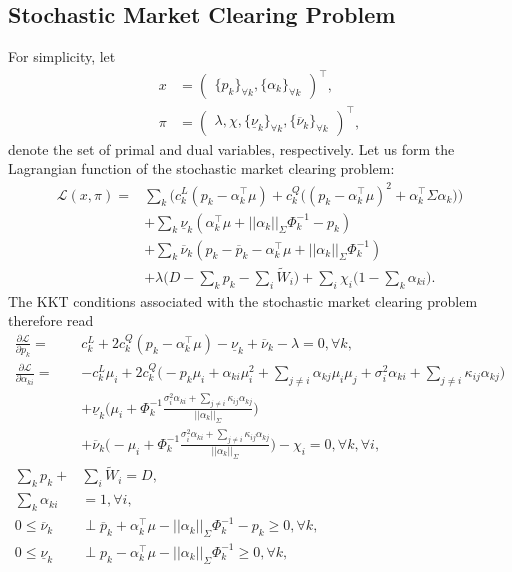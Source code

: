 \documentclass{article}
\begin{document}
\subsection*{Stochastic Market Clearing Problem}
For simplicity, let 
\begin{align*}
x &= \begin{pmatrix} \{p_k\}_{\forall k}, \{\alpha_k\}_{\forall k} \end{pmatrix}^\top,\\
\pi &= \begin{pmatrix} \lambda, \chi, \{\underline{\nu}_k\}_{\forall k}, \{\overline{\nu}_k\}_{\forall k} \end{pmatrix}^\top,
\end{align*}
denote the set of primal and dual variables, respectively. Let us form the Lagrangian function of the stochastic market clearing problem:
\begin{align*}
\mathcal{L}(x, \pi) =& \sum_k \Big(c_k^L(p_k - \alpha_k^\top \mu) + c_k^Q \big((p_k - \alpha_k^\top \mu)^2 + \alpha_k^\top \Sigma \alpha_k\big)\Big)\\
&+ \sum_k \underline{\nu}_k(\alpha_k^\top \mu + ||\alpha_k||_{\Sigma} \Phi_k^{-1} - p_k)\\
&+ \sum_k \overline{\nu}_k (p_k - \overline{p}_k - \alpha_k^\top \mu + ||\alpha_k||_{\Sigma} \Phi_k^{-1})\\
&+ \lambda\big(D - \sum_k p_k - \sum_i \tilde{W}_i\big) + \sum_i \chi_i \big(1 - \sum_k \alpha_{ki}\big).
\end{align*}
The KKT conditions associated with the stochastic market clearing problem therefore read
\begin{align*}
\frac{\partial \mathcal{L}}{\partial p_k} =& c_k^L + 2 c_k^Q (p_k - \alpha_k^\top \mu) - \underline{\nu}_k + \overline{\nu}_k - \lambda = 0, \forall k,\\
\frac{\partial \mathcal{L}}{\partial \alpha_{ki}} =& - c_k^L \mu_i + 2 c_k^Q\Big(- p_k \mu_i + \alpha_{ki} \mu_i^2 + \sum_{j \ne i} \alpha_{kj} \mu_i \mu_j + \sigma_i^2 \alpha_{ki} + \sum_{j \ne i} \kappa_{ij} \alpha_{kj}\Big)\\
&+ \underline{\nu}_k \Big(\mu_i + \Phi_k^{-1} \frac{\sigma_i^2 \alpha_{ki} + \sum_{j \ne i} \kappa_{ij} \alpha_{kj}}{||\alpha_k||_{\Sigma}}\Big)\\
&+ \overline{\nu}_k \Big(-\mu_i + \Phi_k^{-1} \frac{\sigma_i^2 \alpha_{ki} + \sum_{j \ne i} \kappa_{ij} \alpha_{kj}}{||\alpha_k||_{\Sigma}}\Big) - \chi_i = 0, \forall k, \forall i,\\
\sum_k p_k +& \sum_i \tilde{W}_i = D,\\
\sum_k \alpha_{ki} &= 1, \forall i,\\
0 \le \overline{\nu}_k &\perp \overline{p}_k + \alpha_k^\top \mu - ||\alpha_k||_{\Sigma} \Phi_k^{-1} - p_k \ge 0, \forall k,\\
0 \le \underline{\nu}_k & \perp p_k - \alpha_k^\top \mu - ||\alpha_k||_{\Sigma}\Phi_k^{-1} \ge 0, \forall k,
\end{align*}
\end{document}

